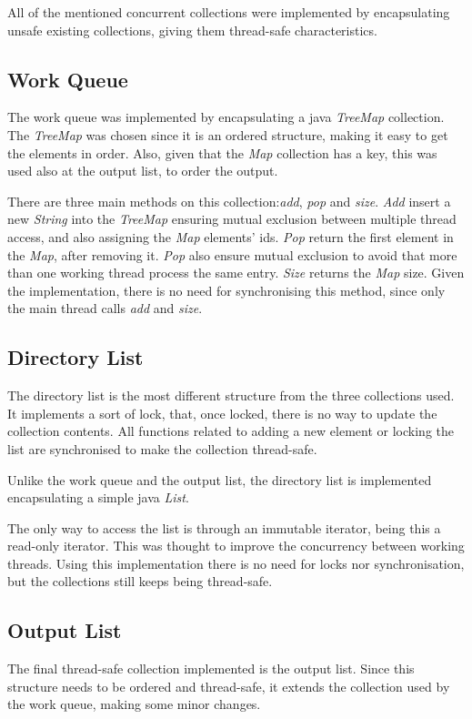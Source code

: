 \documentclass[twocolumn,20pt]{article}
\begin{document}
All of the mentioned concurrent collections were implemented by encapsulating unsafe existing collections, giving them thread-safe characteristics.

\subsection{Work Queue}
The work queue was implemented by encapsulating a java \textit{TreeMap} collection. The \textit{TreeMap} was chosen since it is an ordered structure, making it easy to get the elements in order. Also, given that the \textit{Map} collection has a key, this was used also at the output list, to order the output.

There are three main methods on this collection:\textit{add}, \textit{pop} and \textit{size}. \textit{Add} insert a new \textit{String} into the \textit{TreeMap} ensuring mutual exclusion between multiple thread access, and also assigning the \textit{Map} elements' ids. \textit{Pop} return the first element in the \textit{Map}, after removing it. \textit{Pop} also ensure mutual exclusion to avoid that more than one working thread process the same entry. \textit{Size} returns the \textit{Map} size. Given the implementation, there is no need for synchronising this method, since only the main thread calls \textit{add} and \textit{size}.

\subsection{Directory List}
The directory list is the most different structure from the three collections used. It implements a sort of lock, that, once locked, there is no way to update the collection contents. All functions related to adding a new element or locking the list are synchronised to make the collection thread-safe.

Unlike the work queue and the output list, the directory list is implemented encapsulating a simple java \textit{List}.

The only way to access the list is through an immutable iterator, being this a read-only iterator. This was thought to improve the concurrency between working threads. Using this implementation there is no need for locks nor synchronisation, but the collections still keeps being thread-safe.

\subsection{Output List}
The final thread-safe collection implemented is the output list. Since this structure needs to be ordered and thread-safe, it extends the collection used by the work queue, making some minor changes.
\end{document}
